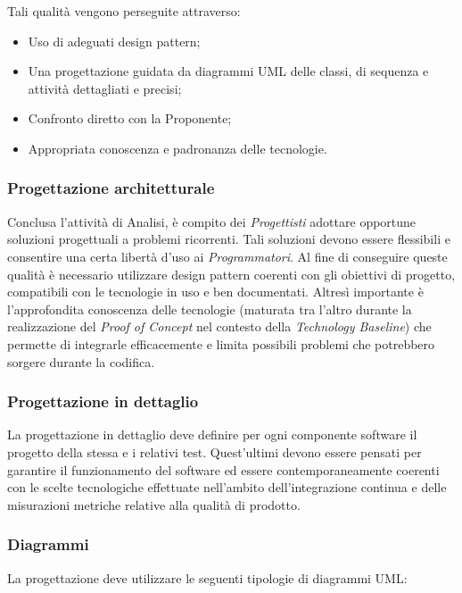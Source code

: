 \documentclass[../NomeDocumento.tex]{subfiles}
\begin{document}
	\noindent Tali qualità vengono perseguite attraverso:
	\begin{itemize}
		\item Uso di adeguati design pattern;
		\item Una progettazione guidata da diagrammi UML delle classi, di sequenza e attività dettagliati e precisi;
		\item Confronto diretto con la Proponente;
		\item Appropriata conoscenza e padronanza delle tecnologie.
	\end{itemize}  
	
	\subsubsection{Progettazione architetturale}
	Conclusa l'attività di Analisi, è compito dei \textit{Progettisti} adottare opportune soluzioni progettuali a problemi ricorrenti. Tali soluzioni devono essere flessibili e consentire una certa libertà d'uso ai \textit{Programmatori}. Al fine di conseguire queste qualità è necessario utilizzare design pattern coerenti con gli obiettivi di progetto, compatibili con le tecnologie in uso e ben documentati. Altresì importante è l'approfondita conoscenza delle tecnologie (maturata tra l'altro durante la realizzazione del \textit{Proof of Concept} nel contesto della \textit{Technology Baseline}) che permette di integrarle efficacemente e limita possibili problemi che potrebbero sorgere durante la codifica. 
	
	\subsubsection{Progettazione in dettaglio}
	La progettazione in dettaglio deve definire per ogni componente software il progetto della stessa e i relativi test. Quest'ultimi devono essere pensati per garantire il funzionamento del software ed essere contemporaneamente coerenti con le scelte tecnologiche effettuate nell'ambito dell'integrazione continua e delle misurazioni metriche relative alla qualità di prodotto. 
	
	\subsubsection{Diagrammi}
	
	La progettazione deve utilizzare le seguenti tipologie di diagrammi UML:
	
\end{document}
